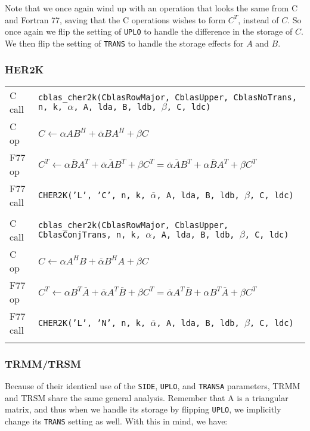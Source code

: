 \documentclass{article}
\begin{document}
Note that we once again wind up with an operation that looks the same from C and
Fortran 77, saving that the C operations wishes to form $C^T$, instead of $C$.
So once again we flip the setting of {\tt UPLO} to handle the difference in the
storage of $C$.  We then flip the setting of {\tt TRANS} to handle the storage
effects for $A$ and $B$.

\subsubsection{HER2K}
{\footnotesize
\begin{tabular}{ll}
C call   & {\tt cblas\_cher2k(CblasRowMajor, CblasUpper, CblasNoTrans, n, k, $\alpha$, A, lda, B, ldb, $\beta$, C, ldc)}\\
C op     & $C \leftarrow \alpha A B^H + \overline{\alpha} B A^H + \beta C$\\
F77 op   & $C^T \leftarrow \alpha \overline{B} A^T + \overline{\alpha} \overline{A} B^T + \beta C^T =
           \overline{\alpha} \overline{A} B^T + \alpha \overline{B} A^T + \beta C^T$\\
F77 call & {\tt CHER2K('L', 'C', n, k, $\overline{\alpha}$, A, lda, B, ldb, $\beta$, C, ldc)}\\\\
%
C call   & {\tt cblas\_cher2k(CblasRowMajor, CblasUpper, CblasConjTrans, n, k, $\alpha$, A, lda, B, ldb, $\beta$, C, ldc)}\\
C op     & $C \leftarrow \alpha A^H B + \overline{\alpha} B^H A + \beta C$\\
F77 op   & $C^T \leftarrow \alpha B^T \overline{A} + \overline{\alpha} A^T \overline{B} + \beta C^T =
           \overline{\alpha} A^T \overline{B} + \alpha B^T \overline{A} + \beta C^T$\\
F77 call & {\tt CHER2K('L', 'N', n, k, $\overline{\alpha}$, A, lda, B, ldb, $\beta$, C, ldc)}\\\\
\end{tabular}
}

\subsubsection{TRMM/TRSM}

Because of their identical use of the {\tt SIDE}, {\tt UPLO}, and {\tt TRANSA}
parameters, TRMM and TRSM share the same general analysis.
Remember that A is a triangular matrix, and thus when we handle its storage by
flipping {\tt UPLO}, we implicitly change its {\tt TRANS} setting as well.
With this in mind, we have:
\end{document}
